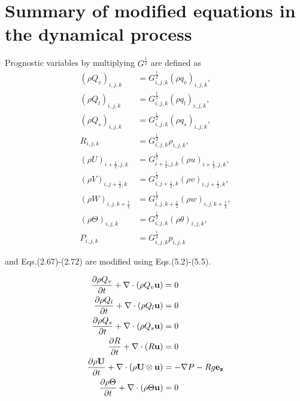 \section{Summary of modified equations in the dynamical process}

Prognostic variables by multiplying $G^{\frac{1}{2}}$ are defined as
\begin{align}
 (\rho Q_v)_{i,j,k}           &= G^{\frac{1}{2}}_{i,j,k}             (\rho q_v)_{i,j,k},        \\
 (\rho Q_l)_{i,j,k}           &= G^{\frac{1}{2}}_{i,j,k}             (\rho q_l)_{i,j,k},        \\
 (\rho Q_s)_{i,j,k}           &= G^{\frac{1}{2}}_{i,j,k}             (\rho q_s)_{i,j,k},        \\
 R_{i,j,k}                    &= G^{\frac{1}{2}}_{i,j,k}              \rho_{i,j,k},                \\
 (\rho U)_{i+\frac{1}{2},j,k} &= G^{\frac{1}{2}}_{i+\frac{1}{2},j,k} (\rho u)_{i+\frac{1}{2},j,k}, \\
 (\rho V)_{i,j+\frac{1}{2},k} &= G^{\frac{1}{2}}_{i,j+\frac{1}{2},k} (\rho v)_{i,j+\frac{1}{2},k}, \\
 (\rho W)_{i,j,k+\frac{1}{2}} &= G^{\frac{1}{2}}_{i,j,k+\frac{1}{2}} (\rho w)_{i,j,k+\frac{1}{2}}, \\
 (\rho \Theta)_{i,j,k}        &= G^{\frac{1}{2}}_{i,j,k}             (\rho \theta)_{i,j,k},        \\
 P_{i,j,k}                    &= G^{\frac{1}{2}}_{i,j,k}              p_{i,j,k}
\end{align}

and Eqs.(2.67)-(2.72) are modified using Eqs.(5.2)-(5.5).

\begin{align}
 \frac{\partial \rho Q_v     }{\partial t} + \nabla \cdot \left( \rho Q_v             {\bf u}\right) &= 0 \\
 \frac{\partial \rho Q_l     }{\partial t} + \nabla \cdot \left( \rho Q_l             {\bf u}\right) &= 0 \\
 \frac{\partial \rho Q_s     }{\partial t} + \nabla \cdot \left( \rho Q_s             {\bf u}\right) &= 0 \\
 \frac{\partial R            }{\partial t} + \nabla \cdot \left( R                    {\bf u}\right) &= 0 \\
 \frac{\partial \rho {\bf U} }{\partial t} + \nabla \cdot \left( \rho {\bf U} \otimes {\bf u}\right) &= -\nabla P - Rg {\bf e_z} \\
 \frac{\partial \rho \Theta  }{\partial t} + \nabla \cdot \left( \rho \Theta          {\bf u}\right) &= 0
\end{align}

